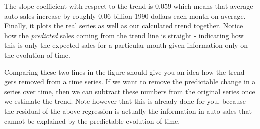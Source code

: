 \documentclass[
]{book}
\newenvironment{Shaded}{\begin{snugshade}}{\end{snugshade}}
\newcommand{\AttributeTok}[1]{\textcolor[rgb]{0.77,0.63,0.00}{#1}}
\newcommand{\ConstantTok}[1]{\textcolor[rgb]{0.00,0.00,0.00}{#1}}
\newcommand{\DecValTok}[1]{\textcolor[rgb]{0.00,0.00,0.81}{#1}}
\newcommand{\FunctionTok}[1]{\textcolor[rgb]{0.00,0.00,0.00}{#1}}
\newcommand{\NormalTok}[1]{#1}
\newcommand{\OtherTok}[1]{\textcolor[rgb]{0.56,0.35,0.01}{#1}}
\newcommand{\SpecialCharTok}[1]{\textcolor[rgb]{0.00,0.00,0.00}{#1}}
\newcommand{\StringTok}[1]{\textcolor[rgb]{0.31,0.60,0.02}{#1}}
\begin{document}
The slope coefficient with respect to the trend is \(0.059\) which means that average auto sales increase by roughly \(0.06\) billion 1990 dollars each month on average. Finally, it plots the real series as well as our calculated trend together. Notice how the \emph{predicted} sales coming from the trend line is straight - indicating how this is only the expected sales for a particular month given information only on the evolution of time.

Comparing these two lines in the figure should give you an idea how the trend gets removed from a time series. If we want to remove the predictable change in a series over time, then we can subtract these numbers from the original series once we estimate the trend. Note however that this is already done for you, because the residual of the above regression is actually the information in auto sales that cannot be explained by the predictable evolution of time.

\begin{Shaded}
\end{Shaded}
\end{document}
